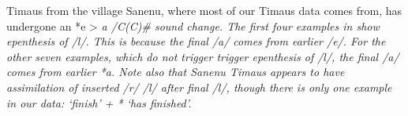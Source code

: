 \documentclass[output=paper]{langscibook}
\begin{document}
\begin{paperappendix}
Timaus from the village Sanenu, where most of our Timaus data comes from,
has undergone an *e > \it{a} /C{\gap}(C){\#} sound change.
The first four examples in  show epenthesis
of /l/. This is because the final /a/ comes from 
  earlier /e/. 
For the other seven examples, which do not trigger trigger epenthesis of /l/,
the final  /a/ comes from earlier *a. 
Note also that Sanenu Timaus appears to have assimilation of inserted /r/ {\ra} /l/
after final /l/, though there is only one example in our data:
 `finish' +  {\ra}
* {\ra}  `has finished'.



\end{paperappendix}
\end{document}
